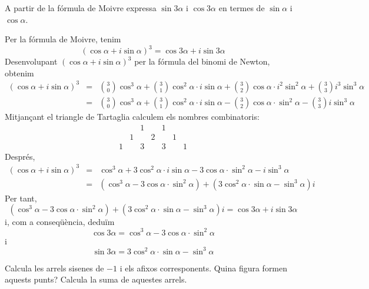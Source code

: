 \begin{exercici}
A partir de la fórmula de Moivre expressa $\sin 3\alpha $ i $\cos 3\alpha
$ en termes de $\sin \alpha $ i $\cos \alpha $.
\end{exercici}

\begin{solucio}
Per la fórmula de Moivre, tenim
\[
\left( \cos \alpha +i\sin \alpha \right) ^{3}=\cos 3\alpha +i\sin 3\alpha
\]
Desenvolupant $\left( \cos \alpha +i\sin \alpha \right) ^{3}$ per la fórmula del binomi de Newton, obtenim
\begin{eqnarray*}
\left( \cos \alpha +i\sin \alpha \right) ^{3} &=&\binom{3}{0}\cos ^{3}\alpha
+\binom{3}{1}\cos ^{2}\alpha \cdot i\sin \alpha +\binom{3}{2}\cos \alpha
\cdot i^{2}\sin ^{2}\alpha +\binom{3}{3}i^{3}\sin ^{3}\alpha \\
&=&\binom{3}{0}\cos ^{3}\alpha +\binom{3}{1}\cos ^{2}\alpha \cdot i\sin
\alpha -\binom{3}{2}\cos \alpha \cdot \sin ^{2}\alpha -\binom{3}{3}i\sin
^{3}\alpha
\end{eqnarray*}
Mitjançant el triangle de Tartaglia calculem els nombres
combinatoris:
\[
\begin{array}{lllllll}
&  & 1 &  & 1 &  &  \\
& 1 &  & 2 &  & 1 &  \\
1 &  & 3 &  & 3 &  & 1
\end{array}
\]
Després,
\begin{eqnarray*}
\left( \cos \alpha +i\sin \alpha \right) ^{3} &=&\cos ^{3}\alpha +3\cos
^{2}\alpha \cdot i\sin \alpha -3\cos \alpha \cdot \sin ^{2}\alpha -i\sin
^{3}\alpha \\
&=&(\cos ^{3}\alpha -3\cos \alpha \cdot \sin ^{2}\alpha )+(3\cos ^{2}\alpha
\cdot \sin \alpha -\sin ^{3}\alpha )i
\end{eqnarray*}
Per tant,
\[
(\cos ^{3}\alpha -3\cos \alpha \cdot \sin ^{2}\alpha )+(3\cos ^{2}\alpha
\cdot \sin \alpha -\sin ^{3}\alpha )i=\cos 3\alpha +i\sin 3\alpha
\]
i, com a conseqüència, deduïm
\[
\cos 3\alpha =\cos ^{3}\alpha -3\cos \alpha \cdot \sin ^{2}\alpha
\]
i
\[
\sin 3\alpha =3\cos ^{2}\alpha \cdot \sin \alpha -\sin ^{3}\alpha
\]
\end{solucio}

\begin{exercici}
Calcula les arrels sisenes de $-1$ i els afixos corresponents.
Quina figura formen aquests punts? Calcula la suma de
aquestes arrels.
\end{exercici}

